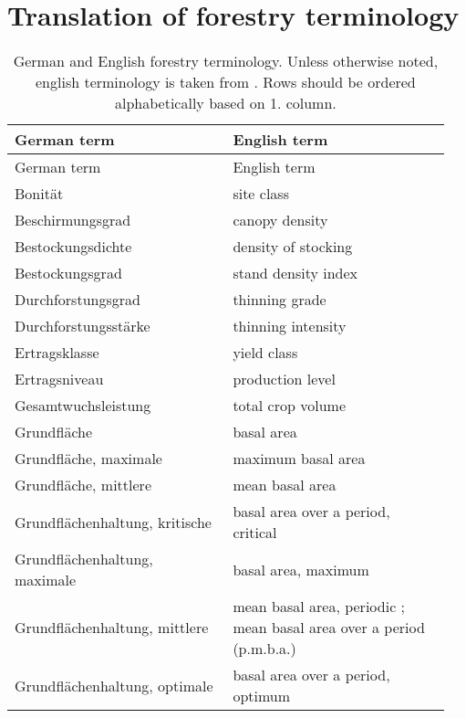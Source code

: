\section{Translation of forestry terminology}

\begin{singlespace}
  {\tabulinesep=2mm
    \begin{longtabu}{p{0.475\linewidth} p{0.475\linewidth}}
      \caption{German and English forestry terminology. Unless otherwise noted, english terminology is taken from \textcite{Schmid-Haas1990}.  Rows should be ordered alphabetically based on 1. column.} \\
      \toprule
      German term & English term \\
      \midrule
      \endfirsthead
      German term & English term \\
      \midrule
      \endhead
      \bottomrule
      \endlastfoot
      Bonität & site class \\
      Beschirmungsgrad & canopy density \\
      Bestockungsdichte & density of stocking \parencite[p.~38]{EFARES1953} \\
      Bestockungsgrad & stand density index \\
      Durchforstungsgrad & thinning grade \\
      Durchforstungsstärke & thinning intensity \\
      Ertragsklasse & yield class \\
      Ertragsniveau & production level \\
      Gesamtwuchsleistung & total crop volume \parencite[p.~152]{Assmann1970} \\
      Grundfläche & basal area \\
      Grundfläche, maximale & maximum basal area \parencite[p.~229]{Assmann1970} \\
      Grundfläche, mittlere & mean basal area \parencite[p.~216]{Assmann1970} \\
      Grundflächenhaltung, kritische & basal area over a period, critical \parencite[p.~229]{Assmann1970} \\
      Grundflächenhaltung, maximale & basal area, maximum \parencite[p.~229]{Assmann1970} \\
      Grundflächenhaltung, mittlere & mean basal area, periodic \parencite[p.~214]{Assmann1970}; mean basal area over a period (p.m.b.a.) \parencite[p.~216]{Assmann1970} \\
      Grundflächenhaltung, optimale & basal area over a period, optimum \parencite[p.~229]{Assmann1970} \\

\end{longtabu}}
\end{singlespace}
